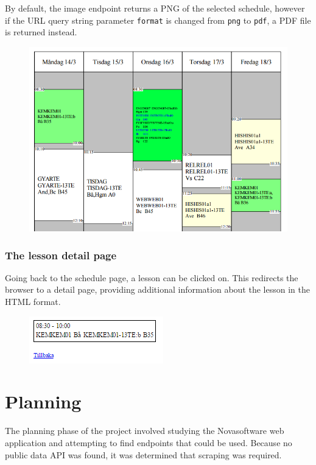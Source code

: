\documentclass{article}
\begin{document}
	By default, the image endpoint returns a PNG of the selected schedule, however if the URL query string parameter \texttt{format} is changed from \texttt{png} to \texttt{pdf}, a PDF file is returned instead.
	
	\begin{figure}[!h]
		\centering
		\includegraphics[width=0.6\linewidth]{images/schedule-pdf-cropped}
		\caption{}
		\label{fig:schedule-pdf}
	\end{figure}
	
	\subsubsection{The lesson detail page}
	Going back to the schedule page, a lesson can be clicked on. This redirects the browser to a detail page, providing additional information about the lesson in the HTML format.
	
	\begin{figure}[!h]
		\centering
		\includegraphics[width=0.5\linewidth]{images/lesson-page}
		\caption{}
		\label{fig:lesson-page}
	\end{figure}
	
	\section{Planning}
	The planning phase of the project involved studying the Novasoftware web application and attempting to find endpoints that could be used. Because no public data API was found, it was determined that scraping was required.
	
\end{document}
